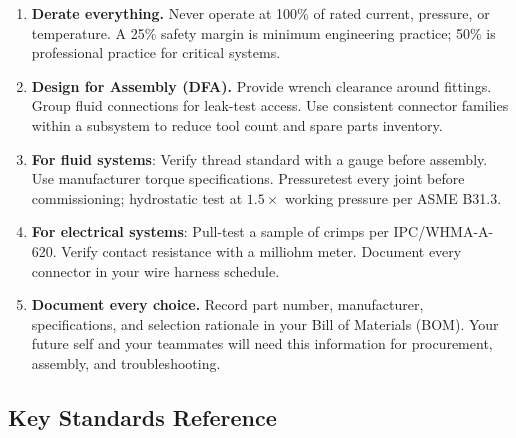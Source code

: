 \begin{enumerate}[leftmargin=1.5em]
  \item \textbf{Derate everything.} Never operate at 100\% of rated current, pressure, or temperature. A 25\% safety margin is minimum engineering practice; 50\% is professional practice for critical systems.

  \item \textbf{Design for Assembly (DFA).} Provide wrench clearance around fittings. Group fluid connections for leak-test access. Use consistent connector families within a subsystem to reduce tool count and spare parts inventory.

  \item \textbf{For fluid systems}: Verify thread standard with a gauge before assembly. Use manufacturer torque specifications. Pressuretest every joint before commissioning; hydrostatic test at $1.5\times$ working pressure per ASME B31.3.

  \item \textbf{For electrical systems}: Pull-test a sample of crimps per IPC/WHMA-A-620. Verify contact resistance with a milliohm meter. Document every connector in your wire harness schedule.

  \item \textbf{Document every choice.} Record part number, manufacturer, specifications, and selection rationale in your Bill of Materials (BOM). Your future self and your teammates will need this information for procurement, assembly, and troubleshooting.
\end{enumerate}


\subsection{Key Standards Reference}

